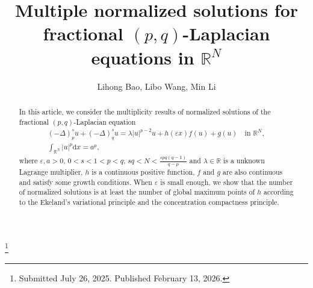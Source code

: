 \documentclass[reqno]{amsart}
\begin{document}
\title[\hfilneg EJDE-2026/14\hfil Fractional $(p,q)$-Laplacian equations in $\mathbb{R}^N$]
{Multiple normalized solutions for fractional $(p,q)$-Laplacian equations
in $\mathbb{R}^N$}

\author[L. Bao, L. Wang, M. Li \hfil EJDE-2026/14\hfilneg]
{Lihong Bao, Libo Wang, Min Li}

\address{Lihong Bao \newline
School of Mathematics and statistics,
Beihua University,
Jilin, Jilin, 132013, China}

\address{Libo Wang (corresponding author) \newline
School of Mathematics and statistics,
Beihua University,
Jilin, Jilin, 132013, China}

\address{Min Li \newline
School of Mathematics and statistics,
Beihua University, 
Jilin, Jilin, 132013, China}

\thanks{Submitted July 26, 2025. Published February 13, 2026.}

\begin{abstract}
In this article, we consider the multiplicity results of normalized solutions of the
fractional $(p,q)$-Laplacian equation
\begin{gather*}
(-\Delta)_p^{s} u+(-\Delta)_q^{s} u=\lambda |u|^{p-2}u+h(\varepsilon x)f(u)+g(u)
\quad\text{in }\mathbb{R}^N,\\
\int_{\mathbb {R}^{N}}|u|^p \mathrm{d}x=a^p,
\end{gather*}
where $\varepsilon, a>0$, $0<s<1<p<q$, $sq<N<\frac{spq(q-1)}{q-p}$ and
$\lambda \in \mathbb {R}$  is a unknown Lagrange multiplier,
$h$ is a continuous positive function, $f$ and $g$ are also continuous and satisfy
some growth conditions.
When $\varepsilon$ is small enough, we show that the number of normalized solutions is
at least the number of global maximum points of $h$ according to the Ekeland's
variational principle and the concentration compactness principle.
\end{abstract}

\maketitle
{}
\newtheorem{theorem}{Theorem}[section]
\newtheorem{lemma}[theorem]{Lemma}
\allowdisplaybreaks
\end{document}
